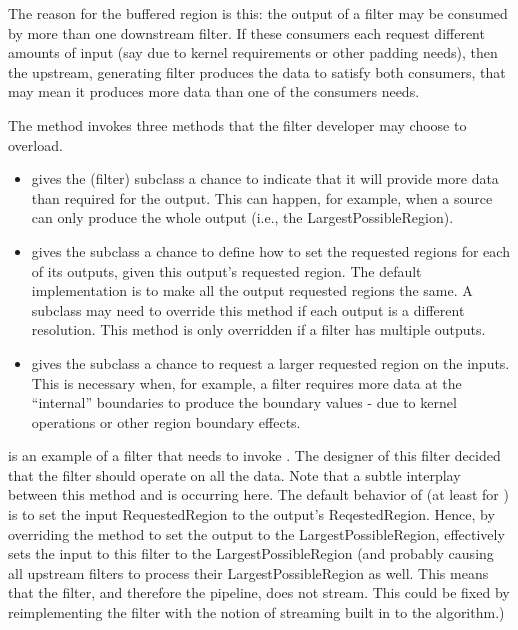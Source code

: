 The reason for the buffered region is this: the output of a filter may be
consumed by more than one downstream filter. If these consumers each request
different amounts of input (say due to kernel requirements or other padding
needs), then the upstream, generating filter produces the data to satisfy
both consumers, that may mean it produces more data than one of the
consumers needs.

The  method invokes
three methods that the filter developer may choose to overload.

\begin{itemize}
        \item {} gives the
        (filter) subclass a chance to indicate that it will provide more data
        than required for the output. This can happen, for example, when a
        source can only produce the whole output (i.e., the
        LargestPossibleRegion).

        \item {} gives 
        the subclass a chance to define how to set the requested regions for 
        each of its outputs, given this output's requested region.  The default
        implementation is to make all the output requested regions the same.
        A subclass may need to override this method if each output is a
        different resolution. This method is only overridden if a filter has
        multiple outputs.

        \item {} gives the subclass a 
        chance to
        request a larger requested region on the inputs. This is necessary
        when, for example, a filter requires more data at the ``internal''
        boundaries to produce the boundary values - due to kernel operations
        or other region boundary effects.
\end{itemize}

 is an example of a filter that needs to
invoke . The designer of this
filter decided that the filter should operate on all the data. Note
that a subtle interplay between this method and
 is occurring here. The default
behavior of  (at least for
) is to set the input RequestedRegion to
the output's ReqestedRegion. Hence, by overriding the method
 to set the output to the
LargestPossibleRegion, effectively sets the input to this filter to
the LargestPossibleRegion (and probably causing all upstream filters
to process their LargestPossibleRegion as well. This means that the
filter, and therefore the pipeline, does not stream. This could be
fixed by reimplementing the filter with the notion of streaming built
in to the algorithm.)

